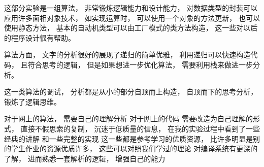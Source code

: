 \documentclass[../report]{subfiles}
\begin{document}
  这部分实验是一组算法，
  非常锻炼逻辑能力和设计能力，
  对数据类型的封装可以应用许多面相对象技术，
  如实现运算时，
  可以使用一个对象的方法更新，
  也可以使用静态方法，
  基本的自动机类型可以由工厂模式的类方法构造，
  这一些对以后的程序设计很有帮助。

  算法方面，
  文字的分析很好的展现了递归的简单优雅，
  利用递归可以快速构造代码，
  且符合思考的逻辑，
  但是如果想进一步优化算法，
  需要利用栈来做进一步分析。

  这一类算法的调试，
  分析都是从小的部分自顶而上构造，
  自顶而下的思考分析，
  锻炼了逻辑思维。

  对于网上的算法，
  需要自己的理解分析
  对于网上的代码
  需要改造为自己理解的形式，
  直接不假思索的复制，
  沉迷于低质量的信息，
  在我的实验过程中看到了一些经典的讲解
  和一些完整的实现
  这一些都是参考学习的优质资源，
  比许多明显是别的学生作业的资源优质许多，
  这些可以对照我们学过的理论
  对编译系统有更深的了解，
  进而熟悉一套解析的逻辑，
  增强自己的能力
\end{document}
